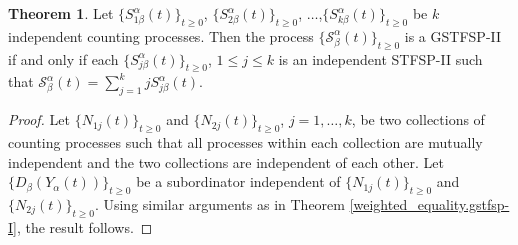 \documentclass[11pt,oneside,reqno]{amsart}
\theoremstyle{definition}
\newtheorem{theorem}{\bf Theorem}[section]
\theoremstyle{remarkstyle}
\begin{document}
\begin{theorem}\label{weighted_equality.gstfsp-II}
    Let $\{S_{1\beta}^{\alpha}(t)\}_{t\geq 0}$, $\{S_{2\beta}^{\alpha}(t)\}_{t\geq 0}$, $\dots$,$\{S_{k\beta}^{\alpha}(t)\}_{t\geq 0}$ be $k$ independent counting processes. Then the process $\{\mathcal{S}_{\beta}^{\alpha}(t)\}_{t\ge 0}$ is a GSTFSP-II if and only if each $\{S_{j\beta}^\alpha(t)\}_{t\ge 0}$, $1\le j\le k$ is an independent STFSP-II such that $\mathcal{S}_{\beta}^{\alpha}(t)=\sum_{j=1}^{k}j S_{j\beta}^\alpha(t)$.
\end{theorem}
\begin{proof}Let $\{N_{1j}(t)\}_{t\ge 0}$ and $\{N_{2j}(t)\}_{t\ge 0}$, $j=1,\dots,k$, be two collections of counting processes such that all processes within each collection are mutually independent and the two collections are independent of each other. Let $\{D_{\beta}(Y_{\alpha}(t))\}_{t\ge 0}$ be a subordinator independent of $\{N_{1j}(t)\}_{t\ge 0}$ and $\{N_{2j}(t)\}_{t\ge 0}$. Using similar arguments as in Theorem \ref{weighted_equality.gstfsp-I}, the result follows.
\end{proof}
\end{document}
